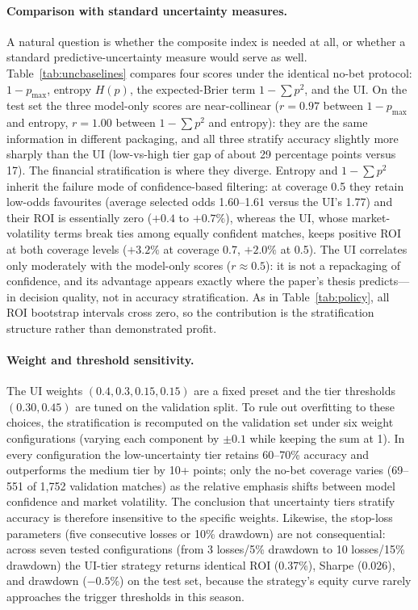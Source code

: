 \paragraph{Comparison with standard uncertainty measures.}

A natural question is whether the composite index is needed at all,
or whether a standard predictive-uncertainty measure would serve as
well. Table~\ref{tab:uncbaselines} compares four scores under the
identical no-bet protocol: $1 - p_{\max}$, entropy $H(p)$, the
expected-Brier term $1 - \sum p^2$, and the UI. On the test set the
three model-only scores are near-collinear ($r = 0.97$ between
$1 - p_{\max}$ and entropy, $r = 1.00$ between $1 - \sum p^2$ and
entropy): they are the same information in different packaging, and
all three stratify accuracy slightly more sharply than the UI
(low-vs-high tier gap of about 29 percentage points versus 17). The
financial stratification is where they diverge. Entropy and
$1 - \sum p^2$ inherit the failure mode of confidence-based
filtering: at coverage 0.5 they retain low-odds favourites (average
selected odds 1.60--1.61 versus the UI's 1.77) and their
ROI is essentially zero ($+0.4$ to $+0.7\%$), whereas the UI, whose
market-volatility terms break ties among equally confident matches,
keeps positive ROI at both coverage levels ($+3.2\%$ at coverage
0.7, $+2.0\%$ at 0.5). The UI correlates only moderately with the
model-only scores ($r \approx 0.5$): it is not a repackaging of
confidence, and its advantage appears exactly where the paper's
thesis predicts---in decision quality, not in accuracy
stratification. As in Table~\ref{tab:policy}, all ROI bootstrap
intervals cross zero, so the contribution is the stratification
structure rather than demonstrated profit.

\paragraph{Weight and threshold sensitivity.}
The UI weights $(0.4, 0.3, 0.15, 0.15)$ are a fixed preset and the
tier thresholds $(0.30, 0.45)$ are tuned on the validation split. To
rule out overfitting to these choices, the stratification
is recomputed on the validation set under six weight configurations (varying each
component by $\pm 0.1$ while keeping the sum at 1). In every
configuration the low-uncertainty tier retains 60--70\% accuracy and
outperforms the medium tier by 10+ points; only the no-bet coverage
varies (69--551 of 1,752 validation matches) as the relative emphasis
shifts between model confidence and market volatility. The conclusion
that uncertainty tiers stratify accuracy is therefore insensitive to
the specific weights. Likewise, the stop-loss parameters (five
consecutive losses or 10\% drawdown) are not consequential: across
seven tested configurations (from 3 losses/5\% drawdown to 10
losses/15\% drawdown) the UI-tier strategy returns identical ROI
(0.37\%), Sharpe (0.026), and drawdown ($-0.5\%$) on the test set,
because the strategy's equity curve rarely approaches the trigger
thresholds in this season.

